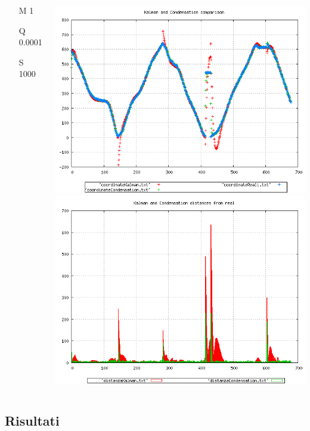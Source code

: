 {\begin{columns}
\begin{scriptsize}
\begin{itemize}
\item [M]1
\item [Q]0.0001
\item [S]1000
\end{itemize}
\end{scriptsize}
\includegraphics[scale=0.1]{../esperimenti/single_car/mod_1-Q_0.0001-S_1000/plot.png}\\
\includegraphics[scale=0.1]{../esperimenti/single_car/mod_1-Q_0.0001-S_1000/plot-distances.png}
\end{columns}
}
\subsection{Risultati}


